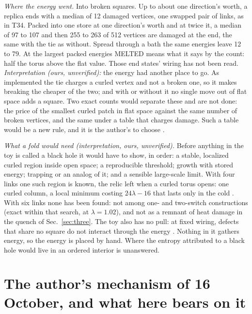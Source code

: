 \documentclass[aps,pre,10pt,twocolumn,superscriptaddress,nofootinbib]{revtex4-2}
\begin{document}
\emph{Where the energy went.} Into broken squares. Up to about one direction's worth, a replica ends with a median of
12 damaged vertices, one swapped pair of links, as in T34. Packed into one store at one direction's worth and at
twice it, a median of 97 to 107 and then 255 to 263 of 512 vertices are damaged at the end, the same with the tie as
without. Spread through a bath the same energies leave 12 to 79. At the largest packed energies MELTED means what it
says by the count: half the torus above the flat value. Those end states' wiring has not been read.
\emph{Interpretation (ours, unverified):} the energy had another place to go. As implemented the tie charges a curled
vertex and not a broken one, so it makes breaking the cheaper of the two; and with or without it no single move out
of flat space adds a square. Two exact counts would separate these and are not done: the price of the smallest curled
patch in flat space against the same number of broken vertices, and the same under a table that charges damage. Such
a table would be a new rule, and it is the author's to choose \cite{repo}.

\emph{What a fold would need (interpretation, ours, unverified).} Before anything in the toy is called a black hole
it would have to show, in order: a stable, localized curled region inside open space; a reproducible threshold;
growth with stored energy; trapping or an analog of it; and a sensible large-scale limit. With four links one such
region is known, the relic left when a curled torus opens: one curled column, a local minimum costing $24\lambda -
16$ that lasts only in the cold \cite{paper2}. With six links none has been found: not among one- and two-switch
constructions (exact within that search, at $\lambda = 1.02$), and not as a remnant of heat damage in the quench of
Sec.~\ref{sec:three}. The toy also has no pull: at fixed wiring, defects that share no square do not interact
through the energy \cite{paper11}. Nothing in it gathers energy, so the energy is placed by hand. Where the entropy
attributed to a black hole would live in an ordered interior is unanswered.

\section{The author's mechanism of 16 October, and what here bears on it}\label{sec:handoff}
\end{document}
